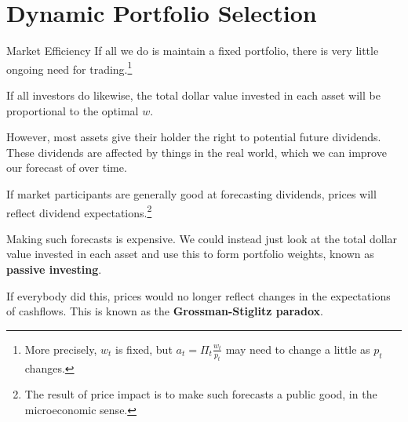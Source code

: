 \documentclass{beamer}
\begin{document}
\section{Dynamic Portfolio Selection}
\begin{frame}{Market Efficiency}
	If all we do is maintain a fixed portfolio, there is very little ongoing need for trading.\footnote{More precisely, $w_t$ is fixed, but $a_t=\Pi_t \frac{w_t}{p_t}$ may need to change a little as $p_t$ changes.}

	If all investors do likewise, the total dollar value invested in each asset will be proportional to the optimal $w$.

	However, most assets give their holder the right to potential future dividends. %
	These dividends are affected by things in the real world, which we can improve our forecast of over time.

	If market participants are generally good at forecasting dividends, prices will reflect dividend expectations.\footnote{The result of price impact is to make such forecasts a public good, in the microeconomic sense.}

	Making such forecasts is expensive. We could instead just look at the total dollar value invested in each asset and use this to form portfolio weights, known as \textbf{passive investing}.

	If everybody did this, prices would no longer reflect changes in the expectations of cashflows. This is known as the \textbf{Grossman-Stiglitz paradox}.
\end{frame}
\end{document}
